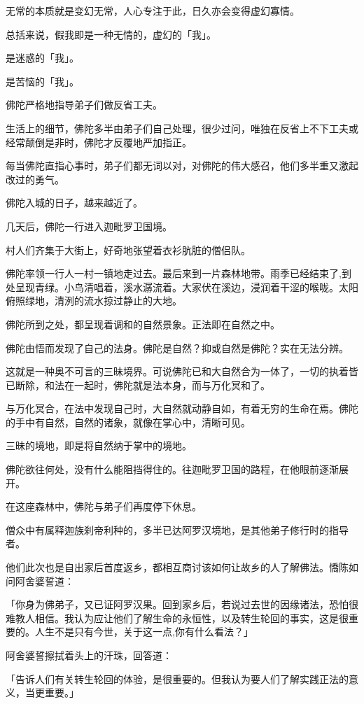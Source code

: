 \documentclass[twoside,openany]{book}
\begin{document}
无常的本质就是变幻无常，人心专注于此，日久亦会变得虚幻寡情。

总括来说，假我即是一种无情的，虚幻的「我」。

是迷惑的「我」。

是苦恼的「我」。

佛陀严格地指导弟子们做反省工夫。

生活上的细节，佛陀多半由弟子们自己处理，很少过问，唯独在反省上不下工夫或经常颠倒是非时，佛陀才反覆地严加指正。

每当佛陀直指心事时，弟子们都无词以对，对佛陀的伟大感召，他们多半重又激起改过的勇气。

佛陀入城的日子，越来越近了。

几天后，佛陀一行进入迦毗罗卫国境。

村人们齐集于大街上，好奇地张望着衣衫肮脏的僧侣队。

佛陀率领一行人一村一镇地走过去。最后来到一片森林地带。雨季已经结束了,到处呈现青绿。小鸟清唱着，溪水潺流着。大家伏在溪边，浸润着干涩的喉咙。太阳俯照绿地，清洌的流水掠过静止的大地。

佛陀所到之处，都呈现着调和的自然景象。正法即在自然之中。

佛陀由悟而发现了自己的法身。佛陀是自然？抑或自然是佛陀？实在无法分辨。

这就是一种奥不可言的三昧境界。可说佛陀已和大自然合为一体了，一切的执着皆已断除，和法在一起时，佛陀就是法本身，而与万化冥和了。

与万化冥合，在法中发现自己时，大自然就动静自如，有着无穷的生命在焉。佛陀的手中有自然，自然的诸象，就像在掌心中，清晰可见。

三昧的境地，即是将自然纳于掌中的境地。

佛陀欲往何处，没有什么能阻挡得住的。往迦毗罗卫国的路程，在他眼前逐渐展开。

在这座森林中，佛陀与弟子们再度停下休息。

僧众中有属释迦族刹帝利种的，多半已达阿罗汉境地，是其他弟子修行时的指导者。

他们此次也是自出家后首度返乡，都相互商讨该如何让故乡的人了解佛法。憍陈如问阿舍婆誓道：

「你身为佛弟子，又已证阿罗汉果。回到家乡后，若说过去世的因缘诸法，恐怕很难教人相信。我认为应让他们了解生命的永恒性，以及转生轮回的事实，这是很重要的。人生不是只有今世，关于这一点,你有什么看法？」

阿舍婆誓擦拭着头上的汗珠，回答道：

「告诉人们有关转生轮回的体验，是很重要的。但我认为要人们了解实践正法的意义，当更重要。」
\end{document}
